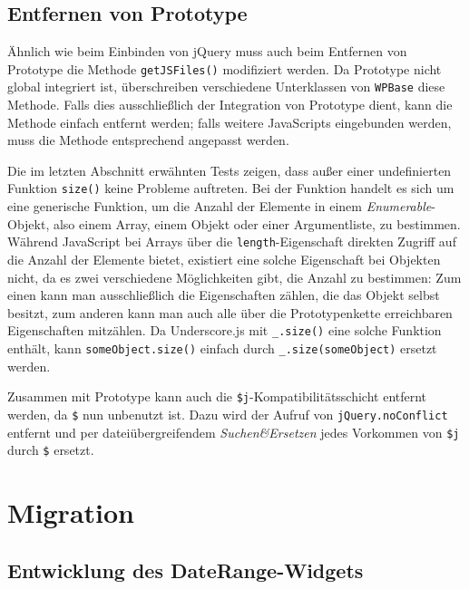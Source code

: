 \subsection{Entfernen von Prototype}

Ähnlich wie beim Einbinden von jQuery muss auch beim Entfernen von Prototype die Methode
\lstinline{getJSFiles()} modifiziert werden. Da Prototype nicht global integriert ist, überschreiben
verschiedene Unterklassen von \lstinline{WPBase} diese Methode. Falls dies ausschließlich der
Integration von Prototype dient, kann die Methode einfach entfernt werden; falls weitere JavaScripts
eingebunden werden, muss die Methode entsprechend angepasst werden.

Die im letzten Abschnitt erwähnten Tests zeigen, dass außer einer undefinierten Funktion
\lstinline{size()} keine Probleme auftreten. Bei der Funktion handelt es sich um eine generische
Funktion, um die Anzahl der Elemente in einem \emph{Enumerable}-Objekt, also einem Array, einem
Objekt oder einer Argumentliste, zu bestimmen. Während JavaScript bei Arrays über die
\lstinline{length}-Eigenschaft direkten Zugriff auf die Anzahl der Elemente bietet, existiert eine
solche Eigenschaft bei Objekten nicht, da es zwei verschiedene Möglichkeiten gibt, die Anzahl zu
bestimmen: Zum einen kann man ausschließlich die Eigenschaften zählen, die das Objekt selbst
besitzt, zum anderen kann man auch alle über die Prototypenkette erreichbaren Eigenschaften
mitzählen. Da Underscore.js mit \lstinline{_.size()} eine solche Funktion enthält, kann
\lstinline{someObject.size()} einfach durch \lstinline{_.size(someObject)} ersetzt werden.

Zusammen mit Prototype kann auch die \lstinline{$j}-Kompatibilitätsschicht entfernt werden, da
\lstinline{$} nun unbenutzt ist. Dazu wird der Aufruf von \lstinline{jQuery.noConflict} entfernt und
per dateiübergreifendem \emph{Suchen\&Ersetzen} jedes Vorkommen von \lstinline{$j} durch
\lstinline{$} ersetzt.

\section{Migration}

\subsection{Entwicklung des DateRange-Widgets}

